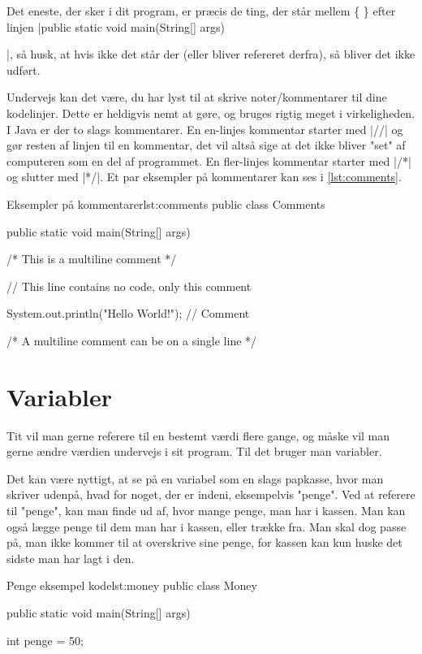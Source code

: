 Det eneste, der sker i dit program, er præcis de ting, der står mellem \{ \} efter linjen \JavaInline|public static void main(String[] args) {|, så husk, at hvis ikke det står der (eller bliver refereret derfra), så bliver det ikke udført.

\begin{remark}
	Undervejs kan det være, du har lyst til at skrive noter/kommentarer til dine kodelinjer. Dette er heldigvis nemt at gøre, og bruges rigtig meget i virkeligheden. I Java er der to slags kommentarer. En en-linjes kommentar starter med \JavaInline|//| og gør resten af linjen til en kommentar, det vil altså sige at det ikke bliver "set" af computeren som en del af programmet. En fler-linjes kommentar starter med \JavaInline|/*| og slutter med \JavaInline|*/|. Et par eksempler på kommentarer kan ses i \autoref{lst:comments}.
\end{remark}

\begin{JavaCode}{Eksempler på kommentarer}{lst:comments}
	public class Comments {
		public static void main(String[] args) {
			/*
			This 
			is
			a 
			multiline 
			comment
			*/
			
			// This line contains no code, only this comment
			
			System.out.println("Hello World!");	// Comment
			
			/* A multiline comment can be on a single line */
		}
	}
\end{JavaCode}

\section{Variabler}
Tit vil man gerne referere til en bestemt værdi flere gange, og måske vil man gerne ændre værdien undervejs i sit program. Til det bruger man variabler. 

Det kan være nyttigt, at se på en variabel som en slags papkasse, hvor man skriver udenpå, hvad for noget, der er indeni, eksempelvis "penge". Ved at referere til "penge", kan man finde ud af, hvor mange penge, man har i kassen. Man kan også lægge penge til dem man har i kassen, eller trække fra. Man skal dog passe på, man ikke kommer til at overskrive sine penge, for kassen kan kun huske det sidste man har lagt i den.

\begin{JavaCode}{Penge eksempel kode}{lst:money}
public class Money {
	public static void main(String[] args) {
		int penge = 50;
		
}}
\end{JavaCode}}
